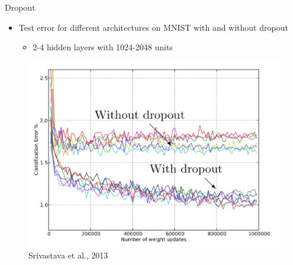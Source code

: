 \documentclass[serif, aspectratio=169]{beamer}
\begin{document}
\begin{frame}{Dropout}
	\begin{itemize}
		\item Test error for different architectures on MNIST with and without dropout
		\begin{itemize}
			\item 2-4 hidden layers with 1024-2048 units
		\end{itemize}
	\end{itemize}
	\begin{figure}[htpb]
		\begin{center}
			\includegraphics[keepaspectratio, scale=0.22]{pic/dropout4}
			\caption*{\scriptsize Srivastava et al., 2013}
		\end{center}
	\end{figure}
\end{frame}
\end{document}
